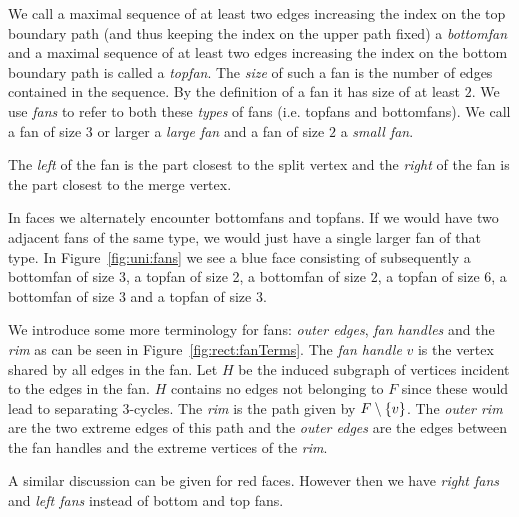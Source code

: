     We call a maximal sequence of at least two edges increasing the index on the top boundary path (and thus keeping the index on the upper path fixed) a \emph{bottomfan} and a maximal sequence of at least two edges increasing the index on the bottom boundary path is called a \emph{topfan}.
    The \emph{size} of such a fan is the number of edges contained in the sequence. By the definition of a fan it has size of at least $2$.
    We use \emph{fans} to refer to both these \emph{types} of fans (i.e. topfans and bottomfans).
    We call a fan of size $3$ or larger a \emph{large fan} and a fan of size $2$ a \emph{small fan}.

    The \emph{left} of the fan is the part closest to the split vertex and the \emph{right} of the fan is the part closest to the merge vertex.

    In faces we alternately encounter bottomfans and topfans. If we would have two adjacent fans of the same type, we would just have a single larger fan of that type.
    In Figure~\ref{fig:uni:fans} we see a blue face consisting of subsequently a bottomfan of size $3$, a topfan of size 2, a bottomfan of size $2$, a topfan of size $6$, a bottomfan of size $3$ and a topfan of size $3$.

   We introduce some more terminology for fans: \emph{outer edges}, \emph{fan handles} and the \emph{rim} as can be seen in Figure~\ref{fig:rect:fanTerms}. The \emph{fan handle} $v$ is the vertex shared by all edges in the fan. Let $H$ be the induced subgraph of vertices incident to the edges in the fan. $H$ contains no edges not belonging to $F$ since these would lead to separating 3-cycles. The \emph{rim} is the path given by $F\setminus \left\lbrace {v} \right\rbrace$.
   The \emph{outer rim} are the two extreme edges of this path and the \emph{outer edges} are the edges between the fan handles and the extreme vertices of the \emph{rim}.

   A similar discussion can be given for red faces. However then we have \emph{right fans} and \emph{left fans} instead of bottom and top fans.

\newpage{}

